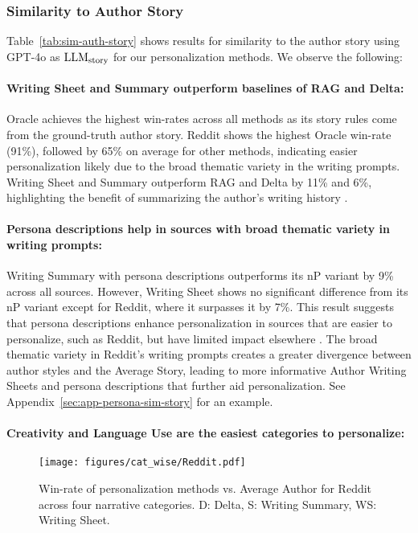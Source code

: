 \subsubsection{Similarity to Author Story}

Table~\ref{tab:sim-auth-story} shows results for similarity to the author story using GPT-4o as \(\text{LLM\textsubscript{story}}\) for our personalization methods. We observe the following:

\paragraph{Writing Sheet and Summary outperform baselines of RAG and Delta:} 
Oracle achieves the highest win-rates across all methods as its story rules come from the ground-truth author story. Reddit shows the highest Oracle win-rate (91\%), followed by 65\% on average for other methods, indicating easier personalization likely due to the broad thematic variety in the writing prompts. Writing Sheet and Summary outperform RAG and Delta by 11\% and 6\%, highlighting the benefit of summarizing the author's writing history \citep{richardson2023integrating}.


\paragraph{Persona descriptions help in sources with broad thematic variety in writing prompts:} 
Writing Summary with persona descriptions outperforms its nP variant by 9\% across all sources. However, Writing Sheet shows no significant difference from its nP variant except for Reddit, where it surpasses it by 7\%. This result suggests that persona descriptions enhance personalization in sources that are easier to personalize, such as Reddit, but have limited impact elsewhere \citep{zheng-etal-2024-helpful}. The broad thematic variety in Reddit's writing prompts creates a greater divergence between author styles and the Average Story, leading to more informative Author Writing Sheets and persona descriptions that further aid personalization. See Appendix~\ref{sec:app-persona-sim-story} for an example.


\paragraph{Creativity and Language Use are the easiest categories to personalize:}


\begin{figure}[htbp]
\centering
\texttt{[image: figures/cat\_wise/Reddit.pdf]}
\caption{Win-rate of personalization methods vs. Average Author for Reddit across four narrative categories. D: Delta, S: Writing Summary, WS: Writing Sheet.}\label{fig:reddit_win_rates}
\end{figure}

